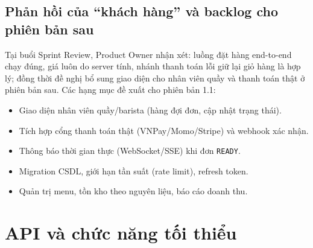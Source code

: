 \documentclass[a4paper]{article}
\newcommand{\st}[1]{\texttt{#1}}
\begin{document}
\subsection{Phản hồi của ``khách hàng'' và backlog cho phiên bản sau}
Tại buổi Sprint Review, Product Owner nhận xét: luồng đặt hàng end-to-end chạy đúng, giá luôn do server tính, nhánh thanh toán lỗi giữ lại giỏ hàng là hợp lý; đồng thời đề nghị bổ sung giao diện cho nhân viên quầy và thanh toán thật ở phiên bản sau. %
Các hạng mục đề xuất cho phiên bản 1.1:
\begin{itemize}
  \item Giao diện nhân viên quầy/barista (hàng đợi đơn, cập nhật trạng thái).
  \item Tích hợp cổng thanh toán thật (VNPay/Momo/Stripe) và webhook xác nhận.
  \item Thông báo thời gian thực (WebSocket/SSE) khi đơn \st{READY}.
  \item Migration CSDL, giới hạn tần suất (rate limit), refresh token.
  \item Quản trị menu, tồn kho theo nguyên liệu, báo cáo doanh thu.
\end{itemize}

\section{API và chức năng tối thiểu}
\end{document}
